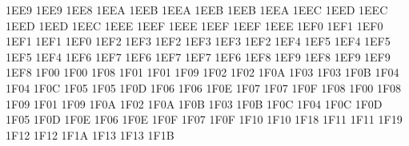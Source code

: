 \setcclcucx 1EE9 1EE9 1EE8 %
\setcclcucx 1EEA 1EEB 1EEA %
\setcclcucx 1EEB 1EEB 1EEA %
\setcclcucx 1EEC 1EED 1EEC %
\setcclcucx 1EED 1EED 1EEC %
\setcclcucx 1EEE 1EEF 1EEE %
\setcclcucx 1EEF 1EEF 1EEE %
\setcclcucx 1EF0 1EF1 1EF0 %
\setcclcucx 1EF1 1EF1 1EF0 %
\setcclcucx 1EF2 1EF3 1EF2 %
\setcclcucx 1EF3 1EF3 1EF2 %
\setcclcucx 1EF4 1EF5 1EF4 %
\setcclcucx 1EF5 1EF5 1EF4 %
\setcclcucx 1EF6 1EF7 1EF6 %
\setcclcucx 1EF7 1EF7 1EF6 %
\setcclcucx 1EF8 1EF9 1EF8 %
\setcclcucx 1EF9 1EF9 1EF8 %
\setcclcucx 1F00 1F00 1F08 %
\setcclcucx 1F01 1F01 1F09 %
\setcclcucx 1F02 1F02 1F0A %
\setcclcucx 1F03 1F03 1F0B %
\setcclcucx 1F04 1F04 1F0C %
\setcclcucx 1F05 1F05 1F0D %
\setcclcucx 1F06 1F06 1F0E %
\setcclcucx 1F07 1F07 1F0F %
\setcclcucx 1F08 1F00 1F08 %
\setcclcucx 1F09 1F01 1F09 %
\setcclcucx 1F0A 1F02 1F0A %
\setcclcucx 1F0B 1F03 1F0B %
\setcclcucx 1F0C 1F04 1F0C %
\setcclcucx 1F0D 1F05 1F0D %
\setcclcucx 1F0E 1F06 1F0E %
\setcclcucx 1F0F 1F07 1F0F %
\setcclcucx 1F10 1F10 1F18 %
\setcclcucx 1F11 1F11 1F19 %
\setcclcucx 1F12 1F12 1F1A %
\setcclcucx 1F13 1F13 1F1B %
